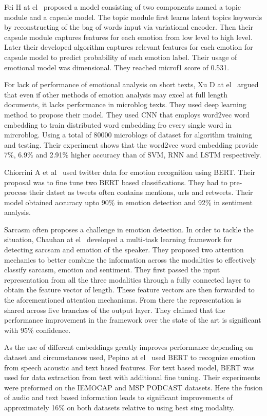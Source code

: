 \documentclass[runningheads]{llncs}
\begin{document}
Fei H at el~\cite{ref22} proposed a model consisting of two components named a topic module and a capsule model. The topic module first learns latent topics keywords by reconstructing of the bag of words input via variational encoder. Then their capsule module captures features for each emotion from low level to high level. Later their developed algorithm captures relevant features for each emotion for capsule model to predict probability of each emotion label. Their usage of emotional model was dimensional. They reached microf1 score of 0.531.

For lack of performance of emotional analysis on short texts, Xu D at el~\cite{ref23} argued that even if other methods of emotion analysis may excel at full length documents, it lacks performance in microblog texts. They used deep learning method to propose their model. They used CNN that employs word2vec word embedding to train distributed word embedding fro every single word in mircroblog. Using a total of 80000 microblogs of dataset for algorithm training and testing. Their experiment shows that the word2vec word embedding provide 7\%, 6.9\% and 2.91\% higher accuracy than of SVM, RNN and LSTM respectively.

Chiorrini A et al~\cite{ref24} used twitter data for emotion recognition using BERT. Their proposal was to fine tune two BERT based classifications. They had to pre-process their datset as tweets often contains mentions, urls and retweets. Their model obtained accuracy upto 90\% in emotion detection and 92\% in sentiment analysis.

Sarcasm often proposes a challenge in emotion detection. In order to tackle the situation, Chauhan at el~\cite{ref6} developed a multi-task learning framework for detecting sarcsam and emotion of the speaker. They proposed two attention mechanics to better combine the information across the modalities to effectively classify sarcasm, emotion and sentiment. They first passed the input representation from all the three modalities through a fully connected layer to obtain the feature vector of length. These feature vectors are then forwarded to the aforementioned attention mechanisms. From there the representation is shared across five branches of the output layer. They claimed that the performance improvement in the framework over the state of the art is significant with 95\% confidence.

As the use of different embeddings greatly improves performance depending on dataset and circumstances used, Pepino at el~\cite{ref25} used BERT to recognize emotion from speech acoustic and text based features. For text based model, BERT was used for data extraction from text with additional fine tuning. Their experiments were preformed on the IEMOCAP and MSP PODCAST datasets. Here the fusion of audio and text based information leads to significant improvements of approximately 16\% on both datasets relative to using best sing modality.
\end{document}
